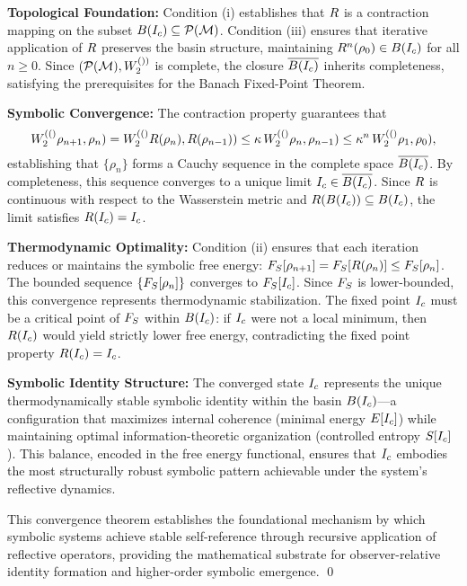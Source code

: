 \begin{demonstratio}
\label{demonstratio:bk7_convergence_within_reflective_basin}
\textbf{Topological Foundation:} Condition (i) establishes that $R$ is a contraction mapping on the subset $B(I_c) \subseteq \mathcal{P}(\mathcal{M})$. Condition (iii) ensures that iterative application of $R$ preserves the basin structure, maintaining $R^n(\rho_0) \in B(I_c)$ for all $n \geq 0$. Since $(\mathcal{P}(\mathcal{M}), W_2^{())}$ is complete, the closure $\overline{B(I_c)}$ inherits completeness, satisfying the prerequisites for the Banach Fixed-Point Theorem.

\textbf{Symbolic Convergence:} The contraction property guarantees that
\[
W_2^{(()}\rho_{n+1}, \rho_n) = W_2^{(()}R(\rho_n), R(\rho_{n-1})) \leq \kappa \, W_2^{(()}\rho_n, \rho_{n-1}) \leq \kappa^n \, W_2^{(()}\rho_1, \rho_0),
\]
establishing that $\{\rho_n\}$ forms a Cauchy sequence in the complete space $\overline{B(I_c)}$. By completeness, this sequence converges to a unique limit $I_c \in \overline{B(I_c)}$. Since $R$ is continuous with respect to the Wasserstein metric and $R(B(I_c)) \subseteq B(I_c)$, the limit satisfies $R(I_c) = I_c$.

\textbf{Thermodynamic Optimality:} Condition (ii) ensures that each iteration reduces or maintains the symbolic free energy: $F_S[\rho_{n+1}] = F_S[R(\rho_n)] \leq F_S[\rho_n]$. The bounded sequence $\{F_S[\rho_n]\}$ converges to $F_S[I_c]$. Since $F_S$ is lower-bounded, this convergence represents thermodynamic stabilization. The fixed point $I_c$ must be a critical point of $F_S$ within $B(I_c)$: if $I_c$ were not a local minimum, then $R(I_c)$ would yield strictly lower free energy, contradicting the fixed point property $R(I_c) = I_c$.

\textbf{Symbolic Identity Structure:} The converged state $I_c$ represents the unique thermodynamically stable symbolic identity within the basin $B(I_c)$—a configuration that maximizes internal coherence (minimal energy $E[I_c]$) while maintaining optimal information-theoretic organization (controlled entropy $S[I_c]$). This balance, encoded in the free energy functional, ensures that $I_c$ embodies the most structurally robust symbolic pattern achievable under the system's reflective dynamics.

This convergence theorem establishes the foundational mechanism by which symbolic systems achieve stable self-reference through recursive application of reflective operators, providing the mathematical substrate for observer-relative identity formation and higher-order symbolic emergence. \qed
\end{demonstratio}

